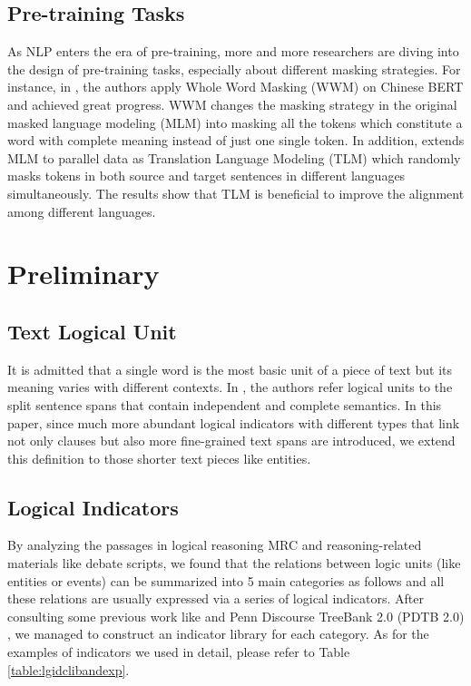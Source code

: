 \documentclass[11pt]{article}
\begin{document}
\subsection{Pre-training Tasks}

As NLP enters the era of pre-training, more and more researchers are diving into the design of pre-training tasks, especially about different masking strategies. For instance, in \citet{wwm}, the authors apply Whole Word Masking (WWM) on Chinese BERT and achieved great progress. WWM changes the masking strategy in the original masked language modeling (MLM) into masking all the tokens which constitute a word with complete meaning instead of just one single token.
In addition, \citet{tlm} extends MLM to parallel data as Translation Language Modeling (TLM) which randomly masks tokens in both source and target sentences in different languages simultaneously. The results show that TLM is beneficial to improve the alignment among different languages.


\section{Preliminary}


\subsection{Text Logical Unit}





It is admitted that a single word is the most basic unit of a piece of text but its meaning varies with different contexts. In \citet{logiformer}, the authors refer logical units to the split sentence spans that contain independent and complete semantics. In this paper, since much more abundant logical indicators with different types that link not only clauses but also more fine-grained text spans are introduced, we extend this definition to those shorter text pieces like entities.  


\subsection{Logical Indicators} \label{logicindicators}




By analyzing the passages in logical reasoning MRC and reasoning-related materials like debate scripts, we found that the relations between logic units (like entities or events) can be summarized into 5 main categories as follows and all these relations are usually expressed via a series of logical indicators. After consulting some previous work like \citet{logigan} and Penn Discourse TreeBank 2.0 (PDTB 2.0) \cite{pdtb2}, we managed to construct an indicator library for each category. As for the examples of indicators we used in detail, please refer to Table \ref{table:lgidclibandexp}. 
\end{document}
